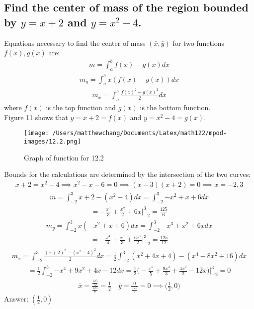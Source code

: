 \documentclass{article}
\begin{document}
\subsection{Find the center of mass of the region bounded by $y = x + 2$ and $y = x^2 - 4$.}
Equations necessary to find the center of mass $(\bar{x}, \bar{y})$ for two functions $f(x), g(x)$ are:
\begin{align*}
	m = \int_a^b {f(x) - g(x) dx}
\end{align*}
\begin{align*}
	m_y = \int_a^b {x(f(x) - g(x))dx}
\end{align*}
\begin{align*}
	m_x = \int_a^b {\frac{f(x)^2 - g(x)^2}{2}dx}
\end{align*}
where $f(x)$ is the top function and $g(x)$ is the bottom function. \\[10pt]
Figure 11 shows that $y= x + 2 = f(x)$ and $y = x^2 - 4 = g(x)$. 
\begin{figure}
	\centering
	\texttt{[image: /Users/matthewchang/Documents/Latex/math122/mpod-images/12.2.png]}
	\caption{Graph of function for 12.2}
\end{figure}
Bounds for the calculations are determined by the intersection of the two curves:
\begin{align*}
	x + 2 = x^2 - 4 \implies x^2 - x - 6 = 0 \implies (x - 3)(x + 2) = 0 \implies x = -2, 3
\end{align*}
\begin{align*}
	m = \int_{-2}^3 {x + 2 - (x^2 - 4)dx} = \int_{-2}^3 {-x^2 + x + 6 dx}
\end{align*}
\begin{align*}
	= -\frac{x^3}{3} + \frac{x^2}{2} + 6x \bigg|_{-2}^3 = \frac{125}{6}
\end{align*}
\begin{align*}
	m_y = \int_{-2}^3 {x(-x^2 + x + 6)dx} = \int_{-2}^3 {-x^3 + x^2 + 6x dx}
\end{align*}
\begin{align*}
	= - \frac{x^4}{4} + \frac{x^3}{3} + \frac{6x^2}{2} \bigg|_{-2}^3 = \frac{125}{12}
\end{align*}
\begin{align*}
	m_x = \int_{-2}^3 {\frac{(x + 2)^2 - (x^2 - 4)^2}{2}dx} = \frac{1}{2} \int_{-2}^3 {(x^2 + 4x + 4) - (x^4 - 8x^2 + 16)dx}
\end{align*}
\begin{align*}
	= \frac{1}{2} \int_{-2}^3 {-x^4 + 9x^2 + 4x - 12 dx} = \frac{1}{2} \bigg( -\frac{x^5}{5} + \frac{9x^3}{3} + \frac{4x^2}{2} - 12x \bigg) \bigg|_{-2}^3 = 0
\end{align*}
\begin{align*}
	\bar{x} = \frac{\frac{125}{12}}{\frac{125}{6}} = \frac{1}{2} \quad \bar{y} = \frac{0}{\frac{125}{6}} = 0 \implies \bigg( \frac{1}{2}, 0 \bigg)
\end{align*}
Answer: $(\frac{1}{2}, 0)$
\end{document}
